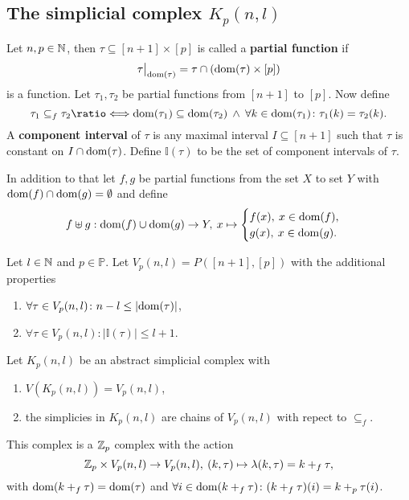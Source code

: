 \subsection{The simplicial complex $K_p(n, l)$}

\begin{defin}
  Let $n, p \in \mathbb{N}$, then $\tau \subseteq [n+1] \times [p]$ is called a \textbf{partial function} if \[\restr{\tau}{\dom(\tau)} = \tau \cap (\dom(\tau) \times [p])\] is a function. Let $\tau_1, \tau_2$ be partial functions from $[n+1]$ to $[p]$. Now define
  \begin{equation*}
    \tau_1 \subseteq_f \tau_2 \longeq \dom(\tau_1) \subseteq \dom(\tau_2) \: \land \: \forall k \in \dom(\tau_1)\colon \tau_1(k) = \tau_2(k).
  \end{equation*}
  A \textbf{component interval} of $\tau$ is any maximal interval $I \subseteq [n+1]$ such that $\tau$ is constant on $I \cap {\rm dom}(\tau)$. Define $\mathbb{I}(\tau)$ to be the set of component intervals of $\tau$. 

  In addition to that let $f, g$ be partial functions from the set $X$ to set $Y$ with ${\rm dom}(f) \cap {\rm dom}(g) = \emptyset$ and define 
  \begin{equation*}
    f \uplus g: {\rm dom}(f) \cup {\rm dom}(g) \to Y, \: x \mapsto \begin{cases}
      f(x), \: x \in {\rm dom}(f), \\
      g(x), \: x \in {\rm dom}(g).
    \end{cases}
  \end{equation*}
\end{defin}

\begin{defin}
  Let $l \in \mathbb{N}$ and $p \in \mathbb{P}$. Let $V_p(n, l) = P([n+1], [p])$ with the additional properties
  \begin{enumerate}[label=\roman*.)]
    \item $\forall \tau \in V_p(n,l)\colon n - l \leq |{\rm dom}(\tau)|$,
    \item $\forall \tau \in V_p(n,l)\colon \left|\mathbb{I}(\tau)\right| \leq l+1$.
  \end{enumerate}
\end{defin}

\begin{defin}\label{defin:kpnl}
  Let $K_p(n,l)$ be an abstract simplicial complex with
  \begin{enumerate}[label=\roman*.)]
    \item $V(K_p(n,l)) = V_p(n,l)$,
    \item the simplicies in $K_p(n,l)$ are chains of $V_p(n,l)$ with repect to $\subseteq_f$.
  \end{enumerate}
  This complex is a $\mathbb{Z}_p$ complex with the action
  \begin{equation*}
    \mathbb{Z}_p \times V_p(n,l) \to V_p(n,l), \: (k, \tau) \mapsto \lambda(k, \tau) = k +_f \tau,
  \end{equation*}
  with ${\rm dom}(k +_f \tau) = {\rm dom}(\tau)$ and $\forall i\in {\rm dom}(k +_f \tau)\colon (k+_f\tau)(i) = k +_p \tau(i)$.
\end{defin}

